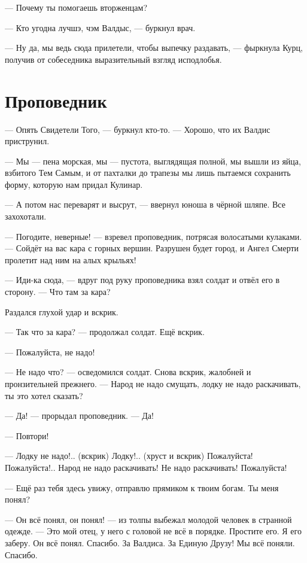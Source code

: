 \asterism

--- Почему ты помогаешь вторженцам?

--- Кто угодна лучшэ, чэм Валдыс, --- буркнул врач.

--- Ну да, мы ведь сюда прилетели, чтобы выпечку раздавать, --- фыркнула Курц, получив от собеседника выразительный взгляд исподлобья.

\section{Проповедник}

--- Опять Свидетели Того, --- буркнул кто-то.
--- Хорошо, что их Валдис приструнил.

--- Мы --- пена морская, мы --- пустота, выглядящая полной, мы вышли из яйца, взбитого Тем Самым, и от пахталки до трапезы мы лишь пытаемся сохранить форму, которую нам придал Кулинар.

--- А потом нас переварят и высрут, --- ввернул юноша в чёрной шляпе.
Все захохотали.

--- Погодите, неверные! --- взревел проповедник, потрясая волосатыми кулаками.
--- Сойдёт на вас кара с горных вершин.
Разрушен будет город, и Ангел Смерти пролетит над ним на алых крыльях!

--- Иди-ка сюда, --- вдруг под руку проповедника взял солдат и отвёл его в сторону.
--- Что там за кара?

Раздался глухой удар и вскрик.

--- Так что за кара? --- продолжал солдат.
Ещё вскрик.

--- Пожалуйста, не надо!

--- Не надо что? --- осведомился солдат.
Снова вскрик, жалобней и пронзительней прежнего.
--- Народ не надо смущать, лодку не надо раскачивать, ты это хотел сказать?

--- Да! --- прорыдал проповедник.
--- Да!

--- Повтори!

--- Лодку не надо!.. (вскрик)
Лодку!.. (хруст и вскрик)
Пожалуйста!
Пожалуйста!..
Народ не надо раскачивать!
Не надо раскачивать!
Пожалуйста!

--- Ещё раз тебя здесь увижу, отправлю прямиком к твоим богам.
Ты меня понял?

--- Он всё понял, он понял! --- из толпы выбежал молодой человек в странной одежде.
--- Это мой отец, у него с головой не всё в порядке.
Простите его.
Я его заберу.
Он всё понял.
Спасибо.
За Валдиса.
За Единую Друзу!
Мы всё поняли.
Спасибо.

